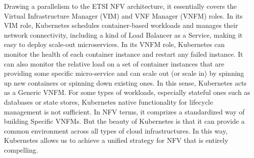
Drawing a parallelism to the ETSI NFV architecture, it essentially covers the Virtual Infrastructure Manager (VIM) and VNF Manager (VNFM) roles. In its VIM role, Kubernetes schedules container-based workloads and manages their network connectivity, including a kind of Load Balancer as a Service, making it easy to deploy scale-out microservices. In its VNFM role, Kubernetes can monitor the health of each container instance and restart any failed instance.  It can also monitor the relative load on a set of container instances that are providing some specific micro-service and can scale out (or scale in) by spinning up new containers or spinning down existing ones.  In this sense, Kubernetes acts as a Generic VNFM.  For some types of workloads, especially stateful ones such as databases or state stores, Kubernetes native functionality for lifecycle management is not sufficient. In NFV terms, it comprizes a standardized way of building Specific VNFMs. But the beauty of Kubernetes is that it can provide a common environment across all types of cloud infrastructures. In this way, Kubernetes allows us to achieve a unified strategy for NFV that is entirely compelling.


